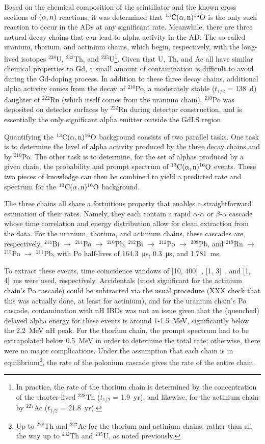\documentclass[../thesis.tex]{subfiles}
\begin{document}
Based on the chemical composition of the scintillator and the known cross sections of $(\alpha,\mathrm{n})$ reactions, it was determined that $^{13}\mathrm{C}(\alpha, \mathrm{n})^{16}\mathrm{O}$ is the only such reaction to occur in the ADs at any significant rate. Meanwhile, there are three natural decay chains that can lead to alpha activity in the AD: The so-called uranium, thorium, and actinium chains, which begin, respectively, with the long-lived isotopes $^{238}$U, $^{232}$Th, and $^{235}$U\footnote{In practice, the rate of the thorium chain is determined by the concentration of the shorter-lived $^{228}$Th ($t_{1/2}$ = 1.9~yr), and likewise, for the actinium chain by $^{227}$Ac ($t_{1/2}$ = 21.8~yr).}. Given that U, Th, and Ac all have similar chemical properties to Gd, a small amount of contamination is difficult to avoid during the Gd-doping process. In addition to these three decay chains, additional alpha activity comes from the decay of $^{210}$Po, a moderately stable ($t_{1/2}$ = 138~d) daughter of $^{222}$Rn (which itself comes from the uranium chain). $^{210}$Po was deposited on detector surfaces by $^{222}$Rn during detector construction, and is essentially the only significant alpha emitter outside the GdLS region.

Quantifying the $^{13}\mathrm{C}(\alpha, \mathrm{n})^{16}\mathrm{O}$ background consists of two parallel tasks. One task is to determine the level of alpha activity produced by the three decay chains and by $^{210}$Po. The other task is to determine, for the set of alphas produced by a given chain, the probability and prompt spectrum of $^{13}\mathrm{C}(\alpha, \mathrm{n})^{16}\mathrm{O}$ events. These two pieces of knowledge can then be combined to yield a predicted rate and spectrum for the $^{13}\mathrm{C}(\alpha, \mathrm{n})^{16}\mathrm{O}$ background.

The three chains all share a fortuitious property that enables a straightforward estimation of their rates. Namely, they each contain a rapid $\alpha$-$\alpha$ or $\beta$-$\alpha$ cascade whose time correlation and energy distribution allow for clean extraction from the data. For the uranium, thorium, and actinium chains, these cascades are, respectively, $^{214}$Bi $\to$ $^{214}$Po $\to$ $^{210}$Pb, $^{212}$Bi $\to$ $^{212}$Po $\to$ $^{208}$Pb, and $^{219}$Rn $\to$ $^{215}$Po $\to$ $^{211}$Pb, with Po half-lives of \SI{164.3}{\micro s}, \SI{0.3}{\micro s}, and \SI{1.781}{ms}.

To extract these events, time coincidence windows of [10, 400]~\us, [1, 3]~\us, and [1, 4]~ms were used, respectively. Accidentals (most significant for the actinium chain's Po cascade) could be subtracted via the usual procedure (XXX check that this was actually done, at least for actinium), and for the uranium chain's Po cascade, contamination with nH IBDs was not an issue given that the (quenched) delayed alpha energy for these events is around 1-1.5~MeV, significantly below the 2.2~MeV nH peak. For the thorium chain, the prompt spectrum had to be extrapolated below 0.5~MeV in order to determine the total rate; otherwise, there were no major complications. Under the assumption that each chain is in equilibrium\footnote{Up to $^{228}$Th and $^{227}$Ac for the thorium and actinium chains, rather than all the way up to $^{232}$Th and $^{235}$U, as noted previously.}, the rate of the polonium cascade gives the rate of the entire chain.
\end{document}

